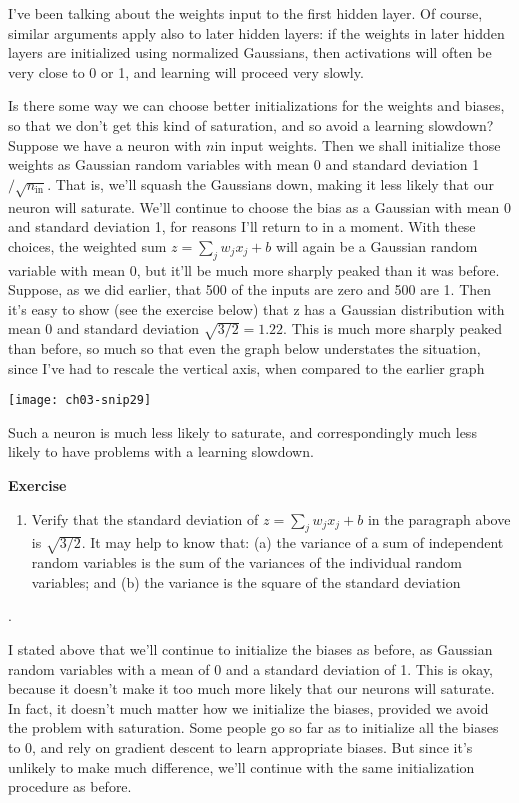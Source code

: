 I've been talking about the weights input to the first hidden layer. Of course, similar arguments apply also to later hidden layers: if the weights in later hidden layers are initialized using normalized Gaussians, then activations will often be very close to 0 or 1, and learning will proceed very slowly.

Is there some way we can choose better initializations for the weights and biases, so that we don't get this kind of saturation, and so avoid a learning slowdown? Suppose we have a neuron with $n\textrm{in}$ input weights. Then we shall initialize those weights as Gaussian random variables with mean 0 and standard deviation 1$/ \sqrt{n_{\mathrm{in}}}$. That is, we'll squash the Gaussians down, making it less likely that our neuron will saturate. We'll continue to choose the bias as a Gaussian with mean 0 and standard deviation 1, for reasons I'll return to in a moment. With these choices, the weighted sum $z=\sum_{j} w_{j} x_{j}+b$ will again be a Gaussian random variable with mean 0, but it'll be much more sharply peaked than it was before. Suppose, as we did earlier, that 500 of the inputs are zero and 500 are 1. Then it's easy to show (see the exercise below) that z has a Gaussian distribution with mean 0 and standard deviation $\sqrt{3/2}=1.22$. This is much more sharply peaked than before, so much so that even the graph below understates the situation, since I've had to rescale the vertical axis, when compared to the earlier graph
\begin{marginfigure}
    \texttt{[image: ch03-snip29]}
    \end{marginfigure}
Such a neuron is much less likely to saturate, and correspondingly much less likely to have problems with a learning slowdown.

\textbf{Exercise}


\begin{enumerate}
\item  Verify that the standard deviation of $z=\sum_{j} w_{j} x_{j}+b$
    in the paragraph above is $\sqrt{3/2}$. It may help to know that: (a) the variance of a sum of independent random variables is the sum of the variances of the individual random variables; and (b) the variance is the square of the standard deviation
\end{enumerate}. 

I stated above that we'll continue to initialize the biases as before, as Gaussian random variables with a mean of 0 and a standard deviation of 1. This is okay, because it doesn't make it too much more likely that our neurons will saturate. In fact, it doesn't much matter how we initialize the biases, provided we avoid the problem with saturation. Some people go so far as to initialize all the biases to 0, and rely on gradient descent to learn appropriate biases. But since it's unlikely to make much difference, we'll continue with the same initialization procedure as before.

